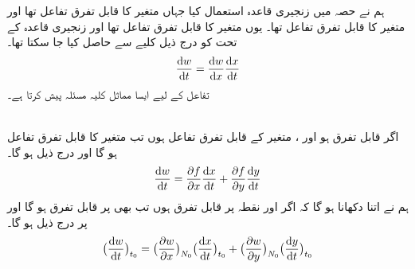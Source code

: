 ہم نے حصہ  میں زنجیری قاعدہ استعمال کیا جہاں   متغیر  کا قابل تفرق تفاعل تھا  اور   متغیر  کا قابل تفرق تفاعل تھا۔ یوں  متغیر  کا قابل تفرق تفاعل تھا اور زنجیری قاعدہ کے تحت  کو درج ذیل کلیے سے حاصل کیا جا سکتا تھا۔
\begin{align*}
\frac{\dif w}{\dif t}=\frac{\dif w}{\dif x}\frac{\dif x}{\dif t}
\end{align*}
تفاعل  کے لیے   ایسا  مماثل کلیہ مسئلہ    پیش کرتا ہے۔

\\
اگر   قابل تفرق ہو اور  ،  متغیر  کے قابل تفرق تفاعل ہوں تب  متغیر  کا قابل تفرق تفاعل ہو گا اور  درج ذیل ہو گا۔
\begin{align}\label{مساوات_کثیرالمتغیر_زنجیری_دو_متغیرات_الف}
\frac{\dif w}{\dif t}=\frac{\partial f}{\partial x}\frac{\dif x}{\dif t}+\frac{\partial f}{\partial y}\frac{\dif y}{\dif t}
\end{align}
ہم نے اتنا دکھانا ہو گا کہ اگر   اور  نقطہ  پر قابل تفرق ہوں تب  بھی  پر قابل تفرق ہو گا اور  پر درج ذیل ہو گا۔
\begin{align}\label{مساوات_کثیرالمتغیر_زنجیری_دو_متغیرات_ب}
\big(\frac{\dif w}{\dif t}\big)_{t_0}=\big(\frac{\partial w}{\partial x}\big)_{N_0}\big(\frac{\dif x}{\dif t}\big)_{t_0}+\big(\frac{\partial w}{\partial y}\big)_{N_0}\big(\frac{\dif y}{\dif t}\big)_{t_0}
\end{align}

